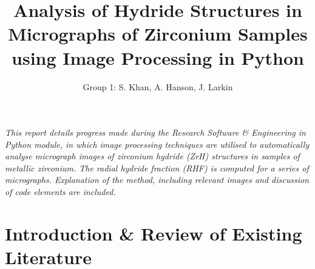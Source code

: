 \documentclass{article}
\title{Analysis of Hydride Structures in Micrographs of Zirconium Samples using Image Processing in Python}
\author{Group 1: S. Khan, A. Hanson, J. Larkin}
\begin{document}
	\maketitle
	
	\begin{center} \textit{This report details progress made during the Research Software \& Engineering in Python module, in which image processing techniques are utilised to automatically analyse micrograph images of zirconium hydride (ZrH) structures in samples of metallic zirconium. The radial hydride fraction (RHF) is computed for a series of micrographs. Explanation of the method, including relevant images and discussion of code elements are included.} \end{center}
	
	\section{Introduction \& Review of Existing Literature}
\end{document}
